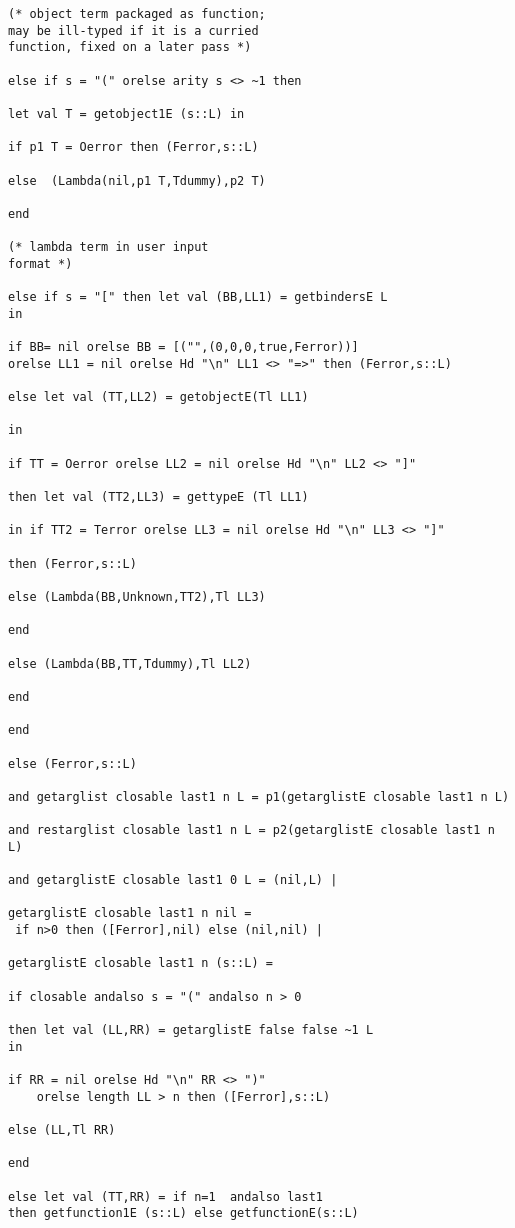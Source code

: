 \documentclass[12pt]{article}
\begin{document}
\begin{verbatim}
(* object term packaged as function;
may be ill-typed if it is a curried
function, fixed on a later pass *)

else if s = "(" orelse arity s <> ~1 then

let val T = getobject1E (s::L) in

if p1 T = Oerror then (Ferror,s::L)

else  (Lambda(nil,p1 T,Tdummy),p2 T)

end

(* lambda term in user input
format *)

else if s = "[" then let val (BB,LL1) = getbindersE L
in

if BB= nil orelse BB = [("",(0,0,0,true,Ferror))]
orelse LL1 = nil orelse Hd "\n" LL1 <> "=>" then (Ferror,s::L)

else let val (TT,LL2) = getobjectE(Tl LL1) 

in

if TT = Oerror orelse LL2 = nil orelse Hd "\n" LL2 <> "]"

then let val (TT2,LL3) = gettypeE (Tl LL1)

in if TT2 = Terror orelse LL3 = nil orelse Hd "\n" LL3 <> "]"

then (Ferror,s::L)

else (Lambda(BB,Unknown,TT2),Tl LL3)

end

else (Lambda(BB,TT,Tdummy),Tl LL2)

end

end

else (Ferror,s::L)

and getarglist closable last1 n L = p1(getarglistE closable last1 n L)

and restarglist closable last1 n L = p2(getarglistE closable last1 n L)

and getarglistE closable last1 0 L = (nil,L) |

getarglistE closable last1 n nil =
 if n>0 then ([Ferror],nil) else (nil,nil) |

getarglistE closable last1 n (s::L) =

if closable andalso s = "(" andalso n > 0

then let val (LL,RR) = getarglistE false false ~1 L
in

if RR = nil orelse Hd "\n" RR <> ")" 
    orelse length LL > n then ([Ferror],s::L)

else (LL,Tl RR)

end

else let val (TT,RR) = if n=1  andalso last1
then getfunction1E (s::L) else getfunctionE(s::L)


\end{verbatim}
\end{document}
